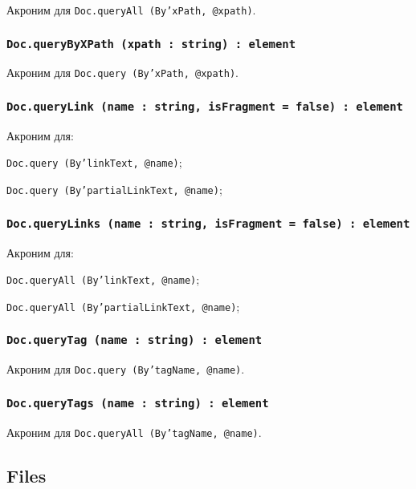 Акроним для \texttt{Doc.queryAll (By'xPath, @xpath)}.

\subsubsection{\texttt{Doc.queryByXPath (xpath : string) : element}}

Акроним для \texttt{Doc.query (By'xPath, @xpath)}.

\subsubsection{\texttt{Doc.queryLink (name : string, isFragment = false) : element}}

Акроним для:
\begin{icItems}
	\item \texttt{Doc.query (By'linkText, @name)};
	\item \texttt{Doc.query (By'partialLinkText, @name)};
\end{icItems}

\subsubsection{\texttt{Doc.queryLinks (name : string, isFragment = false) : element}}

Акроним для:
\begin{icItems}
	\item \texttt{Doc.queryAll (By'linkText, @name)};
	\item \texttt{Doc.queryAll (By'partialLinkText, @name)};
\end{icItems}

\subsubsection{\texttt{Doc.queryTag (name : string) : element}}

Акроним для \texttt{Doc.query (By'tagName, @name)}.

\subsubsection{\texttt{Doc.queryTags (name : string) : element}}

Акроним для \texttt{Doc.queryAll (By'tagName, @name)}.

\subsection{{\color{orange} Files}}

